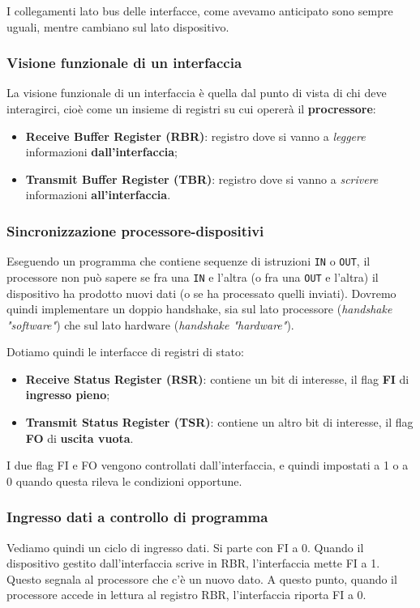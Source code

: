 \documentclass[a4paper,11pt]{article}
\begin{document}
I collegamenti lato bus delle interfacce, come avevamo anticipato sono sempre uguali, mentre cambiano sul lato dispositivo.

\subsubsection{Visione funzionale di un interfaccia}
La visione funzionale di un interfaccia è quella dal punto di vista di chi deve interagirci, cioè come un insieme di registri su cui opererà il \textbf{procressore}:
\begin{itemize}
	\item \textbf{Receive Buffer Register (RBR)}: registro dove si vanno a \textit{leggere} informazioni \textbf{dall'interfaccia};
	\item \textbf{Transmit Buffer Register (TBR)}: registro dove si vanno a \textit{scrivere} informazioni \textbf{all'interfaccia}.
\end{itemize}

\subsubsection{Sincronizzazione processore-dispositivi}
Eseguendo un programma che contiene sequenze di istruzioni \lstinline|IN| o \lstinline|OUT|, il processore non può sapere se fra una \lstinline|IN| e l'altra (o fra una \lstinline|OUT| e l'altra) il dispositivo ha prodotto nuovi dati (o se ha processato quelli inviati).
Dovremo quindi implementare un doppio handshake, sia sul lato processore (\textit{handshake "software"}) che sul lato hardware (\textit{handshake "hardware"}).

\par\smallskip 

Dotiamo quindi le interfacce di registri di stato:
\begin{itemize}
	\item \textbf{Receive Status Register (RSR)}: contiene un bit di interesse, il flag \textbf{FI} di \textbf{ingresso pieno};
	\item \textbf{Transmit Status Register (TSR)}: contiene un altro bit di interesse, il flag \textbf{FO} di \textbf{uscita vuota}. 
\end{itemize}

I due flag FI e FO vengono controllati dall'interfaccia, e quindi impostati a 1 o a 0 quando questa rileva le condizioni opportune.

\subsubsection{Ingresso dati a controllo di programma}
Vediamo quindi un ciclo di ingresso dati.
Si parte con FI a 0.
Quando il dispositivo gestito dall'interfaccia scrive in RBR, l'interfaccia mette FI a 1. Questo segnala al processore che c'è un nuovo dato.
A questo punto, quando il processore accede in lettura al registro RBR, l'interfaccia riporta FI a 0.
\end{document}
